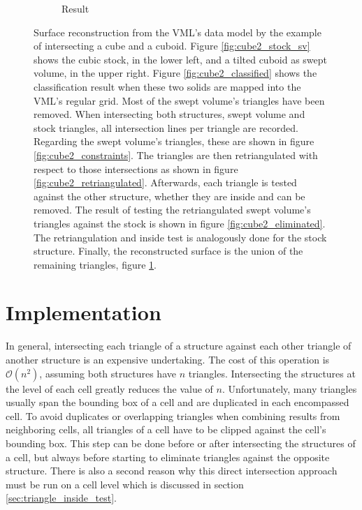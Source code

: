 \begin{figure}
\begin{subfigure}[t]{0.3\textwidth}
		\caption{Result}
		\label{fig:cube2_result}
	\end{subfigure}
	\caption{
		Surface reconstruction from the VML's data model by the example of intersecting a cube and a cuboid.
		Figure \ref{fig:cube2_stock_sv} shows the cubic stock, in the lower left, and a tilted cuboid as swept volume, in the upper right.
		Figure \ref{fig:cube2_classified} shows the classification result when these two solids are mapped into the VML's regular grid.
		Most of the swept volume's triangles have been removed.
		When intersecting both structures, \ie swept volume and stock triangles, all intersection lines per triangle are recorded.
		Regarding the swept volume's triangles, these are shown in figure \ref{fig:cube2_constraints}.
		The triangles are then retriangulated with respect to those intersections as shown in figure \ref{fig:cube2_retriangulated}.
		Afterwards, each triangle is tested against the other structure, whether they are inside and can be removed.
		The result of testing the retriangulated swept volume's triangles against the stock is shown in figure \ref{fig:cube2_eliminated}.
		The retriangulation and inside test is analogously done for the stock structure.
		Finally, the reconstructed surface is the union of the remaining triangles, figure \ref{fig:cube2_result}.
	}
	\label{fig:cube2}
\end{figure}


\section{Implementation}
\label{sec:direct_intersection_implementation}

In general, intersecting each triangle of a structure against each other triangle of another structure is an expensive undertaking.
The cost of this operation is $\mathcal{O}(n^2)$, assuming both structures have $n$ triangles.
Intersecting the structures at the level of each cell greatly reduces the value of $n$.
Unfortunately, many triangles usually span the bounding box of a cell and are duplicated in each encompassed cell.
To avoid duplicates or overlapping triangles when combining results from neighboring cells, all triangles of a cell have to be clipped against the cell's bounding box.
This step can be done before or after intersecting the structures of a cell, but always before starting to eliminate triangles against the opposite structure.
There is also a second reason why this direct intersection approach must be run on a cell level which is discussed in section \ref{sec:triangle_inside_test}.


